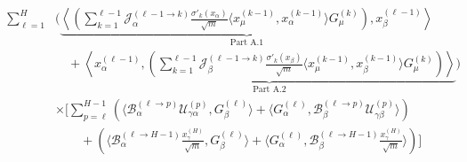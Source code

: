 \documentclass[11pt,a4paper]{article}
\theoremstyle{definition}
\begin{document}
\begin{align}
        \sum_{\ell=1}^{H} & \Biggl( \underbrace{\left\langle \left( \sum_{k=1}^{\ell-1} \mathcal{J}^{(\ell-1 \to k)}_{\alpha} \frac{\sigma'_{k}(x_\alpha)}{\sqrt{m}} \langle x^{(k-1)}_\mu, x^{(k-1)}_\alpha \rangle G^{(k)}_\mu \right), x^{(\ell-1)}_\beta \right\rangle}_{\text{Part A.1}} \nonumber \\
        & \quad + \underbrace{\left\langle x^{(\ell-1)}_\alpha, \left( \sum_{k=1}^{\ell-1} \mathcal{J}^{(\ell-1 \to k)}_{\beta} \frac{\sigma'_{k}(x_\beta)}{\sqrt{m}} \langle x^{(k-1)}_\mu, x^{(k-1)}_\beta \rangle G^{(k)}_\mu \right) \right\rangle}_{\text{Part A.2}} \Biggr) \nonumber \\
        & \times \Biggl[ \sum_{p=\ell}^{H-1} \left( \langle \mathcal{B}^{(\ell \to p)}_{\alpha} \mathcal{U}^{(p)}_{\gamma\alpha}, G^{(\ell)}_\beta \rangle + \langle G^{(\ell)}_\alpha, \mathcal{B}^{(\ell \to p)}_{\beta} \mathcal{U}^{(p)}_{\gamma\beta} \rangle \right) \nonumber \\
        & \qquad + \left( \langle \mathcal{B}^{(\ell \to H-1)}_{\alpha} \frac{x^{(H)}_\gamma}{\sqrt{m}}, G^{(\ell)}_\beta \rangle + \langle G^{(\ell)}_\alpha, \mathcal{B}^{(\ell \to H-1)}_{\beta} \frac{x^{(H)}_\gamma}{\sqrt{m}} \rangle \right) \Biggr]
\end{align}
\end{document}
